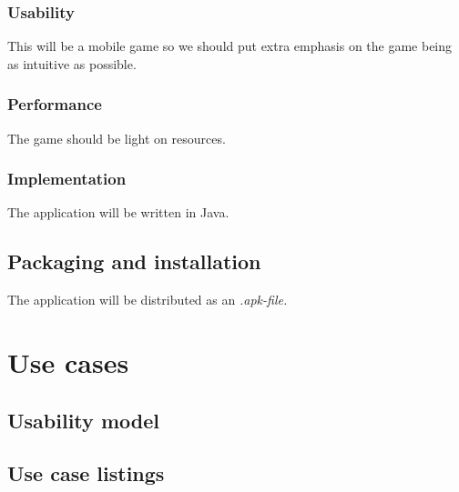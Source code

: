\documentclass{article}
\begin{document}
\subsubsection{Usability}
This will be a mobile game so we should put extra emphasis on the game being as
intuitive as possible.
\subsubsection{Performance}
The game should be light on resources.
\subsubsection{Implementation}
The application will be written in Java.
\subsection{Packaging and installation}
The application will be distributed as an \it{.apk}-file. 
\section{Use cases}
\subsection{Usability model}
\subsection{Use case listings}
\end{document}
